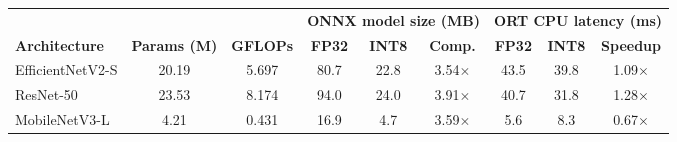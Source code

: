 \begin{tabular}{lcc cc c cc c}
\toprule
 & & & \multicolumn{3}{c}{\textbf{ONNX model size (MB)}} & \multicolumn{3}{c}{\textbf{ORT CPU latency (ms)}} \\
\cmidrule(lr){4-6} \cmidrule(lr){7-9}
\textbf{Architecture} & \textbf{Params (M)} & \textbf{GFLOPs} & \textbf{FP32} & \textbf{INT8} & \textbf{Comp.} & \textbf{FP32} & \textbf{INT8} & \textbf{Speedup} \\
\midrule
EfficientNetV2-S & 20.19 & 5.697 & 80.7 & 22.8 & 3.54$\times$ & 43.5 & 39.8 & 1.09$\times$ \\
ResNet-50 & 23.53 & 8.174 & 94.0 & 24.0 & 3.91$\times$ & 40.7 & 31.8 & 1.28$\times$ \\
MobileNetV3-L & 4.21 & 0.431 & 16.9 & 4.7 & 3.59$\times$ & 5.6 & 8.3 & 0.67$\times$ \\
\bottomrule
\end{tabular}
